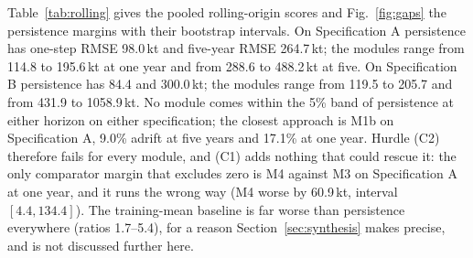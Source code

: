 \documentclass[preprint,11pt,authoryear]{elsarticle}
\theoremstyle{definition}
\theoremstyle{remark}
\begin{document}
Table~\ref{tab:rolling} gives the pooled rolling-origin scores and Fig.~\ref{fig:gaps} the persistence margins with their bootstrap intervals. On Specification A persistence has one-step RMSE 98.0\,kt and five-year RMSE 264.7\,kt; the modules range from 114.8 to 195.6\,kt at one year and from 288.6 to 488.2\,kt at five. On Specification B persistence has 84.4 and 300.0\,kt; the modules range from 119.5 to 205.7 and from 431.9 to 1058.9\,kt. No module comes within the 5\% band of persistence at either horizon on either specification; the closest approach is M1b on Specification A, 9.0\% adrift at five years and 17.1\% at one year. Hurdle (C2) therefore fails for every module, and (C1) adds nothing that could rescue it: the only comparator margin that excludes zero is M4 against M3 on Specification A at one year, and it runs the wrong way (M4 worse by 60.9\,kt, interval $[4.4, 134.4]$). The training-mean baseline is far worse than persistence everywhere (ratios 1.7--5.4), for a reason Section~\ref{sec:synthesis} makes precise, and is not discussed further here.
\end{document}
